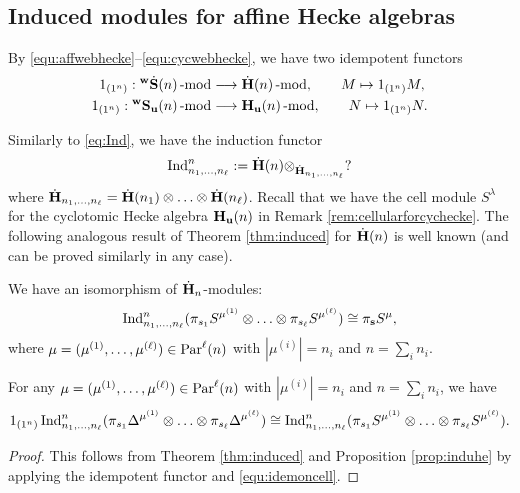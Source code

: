 \subsection{Induced modules for affine Hecke algebras}

By \eqref{equ:affwebhecke}--\eqref{equ:cycwebhecke}, we have two idempotent functors
\begin{align*}
    1_{(1^n)}: {}^{\bold{w}}\dot{\bold{S}}(n)\operatorname{-mod}\nolimits &\longrightarrow \dot{\bf H}(n)\operatorname{-mod}\nolimits, \qquad M\mapsto 1_{(1^n)} M,
    \\
    1_{(1^n)}: {}^{\bold{w}}\bold{S}_{\mathbf{u}}(n)\operatorname{-mod}\nolimits &\longrightarrow \mathbf{H}_{\mathbf{u}}(n)\operatorname{-mod}\nolimits, \qquad N\mapsto 1_{(1^n)} N.
\end{align*}




Similarly to \eqref{eq:Ind}, we have the induction functor 
\[  \text{Ind}_{n_1, \ldots,n_\ell}^n:= \dot{\bf H}(n) \otimes _{\dot{\bf H}_{n_1,\ldots,n_\ell}}? \]
where $\dot{\bf H}_{n_1,\ldots,n_\ell}= \dot{\bf H}(n_1)\otimes \ldots \otimes\dot{\bf H}(n_\ell)$. Recall that we have the cell module  $S^\lambda$ for the cyclotomic Hecke algebra $\mathbf{H}_{\mathbf{u}}(n)$ in Remark \ref{rem:cellularforcychecke}.
The following analogous result of Theorem \ref{thm:induced} for $\dot{\bf H}(n)$ is well known (and can be proved similarly in any case).

\begin{proposition}
\label{prop:induhe}
    We have an isomorphism of $\dot{\bf H}_n$-modules:
    \[ 
\operatorname{Ind}\nolimits_{n_1,\ldots,n_\ell}^n(\pi_{s_1}  S^{\mu^{(1)}}\otimes\ldots \otimes \pi_{s_\ell}  S^{\mu^{(\ell)}} )\cong \pi_{\mathbf{s}}  S^{\mu},
\]
where $\mu=(\mu^{(1)}, \ldots, \mu^{(\ell)})\in \text{Par}^\ell(n)$ with $|\mu^{(i)}|=n_i$ and $n= \sum_i n_i$.
\end{proposition}
\begin{corollary}\label{cor:idemonindu}
For any $\mu=(\mu^{(1)}, \ldots, \mu^{(\ell)})\in \text{Par}^\ell(n)$ with $|\mu^{(i)}|=n_i$ and $n= \sum_i n_i$, we have 
\[ 1_{(1^n)}\operatorname{Ind}\nolimits_{n_1,\ldots,n_\ell}^n(\pi_{s_1}   \Delta^{\mu^{(1)}}\otimes\ldots \otimes \pi_{s_\ell}   \Delta^{\mu^{(\ell)}} )\cong \operatorname{Ind}\nolimits_{n_1,\ldots,n_\ell}^n(\pi_{s_1} S^{\mu^{(1)}}\otimes\ldots \otimes \pi_{s_\ell}  S^{\mu^{(\ell)}} ).
\]
\end{corollary}

\begin{proof}
  This follows from  Theorem \ref{thm:induced} and Proposition \ref{prop:induhe} by applying the idempotent functor and \eqref{equ:idemoncell}.  
\end{proof}

